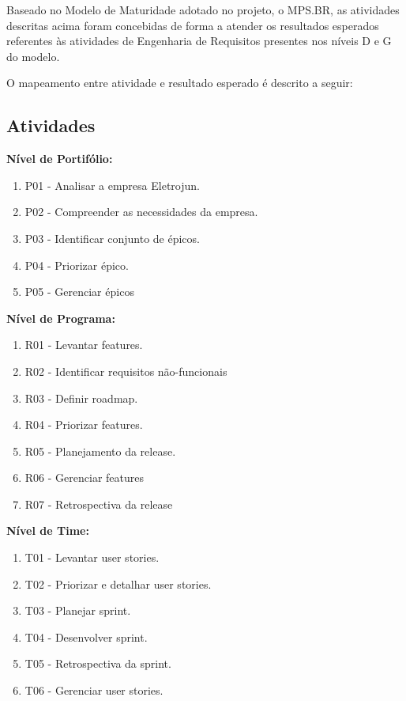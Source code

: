 Baseado no Modelo de Maturidade adotado no projeto, o MPS.BR, as atividades descritas acima foram concebidas de forma a atender os resultados esperados referentes às atividades de Engenharia de Requisitos presentes nos níveis D e G do modelo.

	O mapeamento entre atividade e resultado esperado é descrito a seguir:

\subsection{Atividades}

\textbf{ Nível de Portifólio:}

\begin{enumerate}
\item P01 - Analisar a empresa Eletrojun.
\item P02 - Compreender as necessidades da empresa.
\item P03 - Identificar conjunto de épicos.
\item P04 - Priorizar épico.
\item P05 - Gerenciar épicos
\end{enumerate}

\textbf{Nível de Programa:}

\begin{enumerate}
\item R01 - Levantar features.
\item R02 - Identificar requisitos não-funcionais
\item R03 - Definir roadmap.
\item R04 - Priorizar features.
\item R05 - Planejamento da release.
\item R06 - Gerenciar features
\item R07 - Retrospectiva da release
\end{enumerate}

\textbf{ Nível de Time:}

\begin{enumerate}
\item T01 - Levantar user stories.
\item T02 - Priorizar e detalhar user stories.
\item T03 - Planejar sprint.
\item T04 - Desenvolver sprint.
\item T05 - Retrospectiva da sprint.
\item T06 - Gerenciar user stories.
\end{enumerate}

